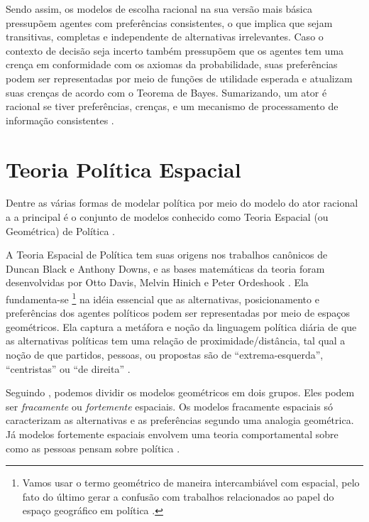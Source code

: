 Sendo assim, os modelos de escolha racional na sua versão mais básica pressupõem
agentes com preferências consistentes, o que implica que sejam transitivas,
completas e independente de alternativas irrelevantes. Caso o contexto de
decisão seja incerto também pressupõem que os agentes tem uma crença em
conformidade com os axiomas da probabilidade, suas preferências podem ser
representadas por meio de funções de utilidade esperada e atualizam suas crenças
de acordo com o Teorema de Bayes. Sumarizando, um ator é racional se tiver
preferências, crenças, e um mecanismo de processamento de informação
consistentes \cite{binmore2008rational}.


\section{Teoria Política Espacial}

Dentre as várias formas de modelar política por meio do modelo do ator racional
a a principal é o conjunto de modelos conhecido como Teoria Espacial (ou
Geométrica) de Política \cite{van2005political}.

A Teoria Espacial de Política tem suas origens nos trabalhos canônicos de Duncan
Black e Anthony Downs, e as bases matemáticas da teoria foram desenvolvidas por
Otto Davis, Melvin Hinich e Peter Ordeshook \cite{black1958theory,
  downs1957economic, poole2005spatial, miller2015spatial}. Ela fundamenta-se
\footnote{Vamos usar o termo geométrico de maneira intercambiável com espacial,
  pelo fato do último gerar a confusão com trabalhos relacionados ao papel do
  espaço geográfico em política \cite{ward2002spatial, poole2005spatial}.} na
idéia essencial que as alternativas, posicionamento e preferências dos agentes
políticos podem ser representadas por meio de espaços geométricos. Ela captura a
metáfora e noção da linguagem política diária de que as alternativas políticas
tem uma relação de proximidade/distância, tal qual a noção de que partidos,
pessoas, ou propostas são de ``extrema-esquerda'', ``centristas'' ou ``de
direita'' \cite{munger2015choosing}.


Seguindo , podemos dividir os modelos
geométricos em dois grupos. Eles podem ser \textit{fracamente} ou
\textit{fortemente} espaciais. Os modelos fracamente espaciais só caracterizam
as alternativas e as preferências segundo uma analogia geométrica. Já modelos
fortemente espaciais envolvem uma teoria comportamental sobre como as pessoas
pensam sobre política \cite{laver2014measuring}.


